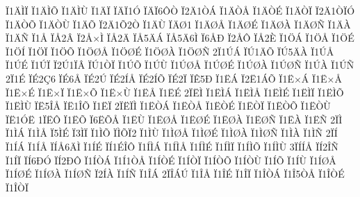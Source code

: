 {^^cf1^^c4^^cc^^cf
^^cf1^^c4^^cc^^d5
^^cf1^^c4^^cc^^d9
^^cf1^^c4^^cf
^^cf^^c4^^cf1^^d3
^^cf^^c4^^cf6^^d4^^d2
^^cf2^^c41^^d2^^c1
^^cf1^^c4^^d2^^c5
^^cf1^^c4^^d2^^c9
^^cf1^^c4^^d2^^cf
^^cf2^^c41^^d2^^cf^^d3
^^cf1^^c4^^d2^^d5
^^cf1^^c4^^d2^^d9
^^cf1^^c4^^d5
^^cf2^^c41^^d52^^d2
^^cf1^^c4^^d9
^^cf^^c4^^d81
^^cf1^^c4^^d8^^c5
^^cf1^^c4^^d8^^c9
^^cf1^^c4^^d8^^c0
^^cf1^^c4^^d8^^d1
^^cf1^^c4^^c0
^^cf1^^c4^^d1
^^cf1^^c5
^^cf^^c52^^c2
^^cf2^^c5^^d7^^cc
^^cf^^c52^^c4
^^cf^^c55^^c4^^c1
^^cf^^c55^^c46^^cc
^^cf6^^c5^^d0
^^cf2^^c5^^d4
^^cf^^c52^^c8
^^cf1^^d6^^c1
^^cf1^^d6^^c5
^^cf1^^d6^^c9
^^cf1^^d6^^cd
^^cf1^^d6^^cf
^^cf1^^d6^^d5
^^cf1^^d6^^d8^^c5
^^cf1^^d6^^d8^^c9
^^cf1^^d6^^d8^^c0
^^cf1^^d6^^d8^^d1
2^^cf1^^da^^c1
^^cf^^da1^^c4^^d5
^^cf^^da5^^c4^^c0
^^cf1^^da^^c5
^^cf1^^da^^c9
^^cf1^^da^^cf
^^cf2^^da1^^cf^^c2
^^cf^^da1^^d2^^cf
^^cf1^^da^^d5
^^cf1^^da^^d9
^^cf1^^da^^d8^^c5
^^cf1^^da^^d8^^c9
^^cf1^^da^^d8^^c0
^^cf1^^da^^d8^^d1
^^cf1^^da^^c0
^^cf1^^da^^d1
2^^cf1^^c9
^^cf^^c92^^c76
^^cf^^c96^^c5
^^cf^^c92^^da
^^cf^^c92^^cd^^c5
^^cf^^c92^^cd^^d5
^^cf^^c92^^cf
^^cf^^ca5^^d0
^^cf1^^cb^^c1
^^cf2^^cb1^^c1^^d5
^^cf1^^cb^^d7^^c1
^^cf1^^cb^^d7^^c5
^^cf1^^cb^^d7^^c9
^^cf1^^cb^^d7^^cf
^^cf1^^cb^^d7^^d5
^^cf1^^cb^^d7^^d9
^^cf1^^cb^^c5
^^cf1^^cb^^c9
2^^cf^^cb^^cc
^^cf1^^cb^^cc^^c1
^^cf1^^cb^^cc^^c5
^^cf1^^cb^^cc^^c9
^^cf1^^cb^^cc^^cf
^^cf1^^cb^^cc^^d5
^^cf1^^cb^^cc^^d9
^^cf^^cb5^^ce^^c5
^^cf^^cb1^^ce^^d5
^^cf1^^cb^^cf
2^^cf^^cb^^cf^^cc
^^cf1^^cb^^d2^^c1
^^cf1^^cb^^d2^^c5
^^cf1^^cb^^d2^^c9
^^cf1^^cb^^d2^^cf
^^cf1^^cb^^d2^^d5
^^cf1^^cb^^d2^^d9
^^cf^^cb1^^d3^^cb
1^^cf^^cb^^d4
^^cf1^^cb^^d5
^^cf6^^cb^^d5^^c5
^^cf1^^cb^^d9
^^cf1^^cb^^d8^^c5
^^cf1^^cb^^d8^^c9
^^cf1^^cb^^d8^^c0
^^cf1^^cb^^d8^^d1
^^cf1^^cb^^c0
^^cf1^^cb^^d1
2^^cf^^cc
^^cf1^^cc^^c1
^^cf1^^cc^^c5
^^cf5^^cc^^c9
^^cf3^^cc^^cf
^^cf1^^cc^^d5
^^cf^^cc^^d5^^cf2
^^cf1^^cc^^d9
^^cf1^^cc^^d8^^c5
^^cf1^^cc^^d8^^c9
^^cf1^^cc^^d8^^c0
^^cf1^^cc^^d8^^d1
^^cf1^^cc^^c0
^^cf1^^cc^^d1
2^^cf^^cd
^^cf1^^cd^^c1
^^cf1^^cd^^c5
^^cf^^cd^^c56^^c4^^cc
^^cf1^^cd^^c9
^^cf^^cd1^^c9^^ce^^d4
^^cf1^^cd^^cc^^c1
^^cf1^^cd^^cc^^c5
^^cf1^^cd^^cc^^c9
^^cf1^^cd^^cc^^cf
^^cf1^^cd^^cc^^d5
^^cf1^^cd^^cc^^d9
3^^cf^^cd^^cd^^c5
^^cf^^cd2^^ce^^d1
^^cf1^^cd^^cf
^^cf^^cd6^^d0^^d3
^^cf^^cd2^^d0^^d4
^^cf1^^cd^^d2^^c1
^^cf1^^cd1^^d2^^c5
^^cf1^^cd^^d2^^c9
^^cf1^^cd^^d2^^cf
^^cf1^^cd^^d2^^d5
^^cf1^^cd^^d2^^d9
^^cf1^^cd^^d5
^^cf1^^cd^^d9
^^cf1^^cd^^d8^^c5
^^cf1^^cd^^d8^^c9
^^cf1^^cd^^d8^^c0
^^cf1^^cd^^d8^^d1
^^cf2^^cd^^c0
^^cf1^^cd^^d1
^^cf1^^ce^^c1
2^^cf^^ce^^c1^^da
^^cf1^^ce^^c5
^^cf1^^ce^^c9
^^cf1^^ce^^cf
^^cf1^^ce^^d2^^c1
^^cf1^^ce5^^d2^^c5
^^cf1^^ce^^d2^^c9
^^cf1^^ce^^d2^^cf
}
